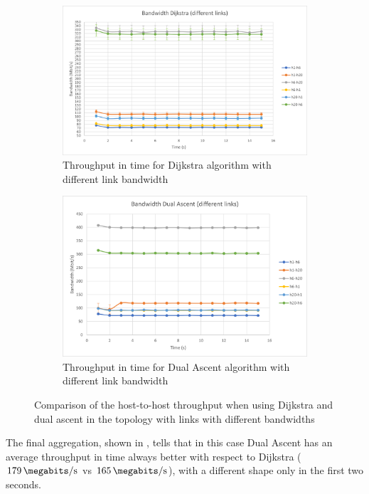 \begin{figure}
	\centering
	\begin{subfigure}[b]{\textwidth}
		\includegraphics[width=\textwidth]{img/band-div-dijkstra.png}
		\caption{Throughput in time for Dijkstra algorithm with
		different link bandwidth}\label{subfig:band-div-dijkstra}
	\end{subfigure}
	\begin{subfigure}[b]{\textwidth}
		\centering
		\includegraphics[width=\textwidth]{img/band-div-dual.png}
		\caption{Throughput in time for Dual Ascent algorithm with
		different link bandwidth}\label{subfig:band-div-dual}
	\end{subfigure}
	\caption{Comparison of the host-to-host throughput when using Dijkstra
	and dual ascent in the topology with links with different
	bandwidths}\label{fig:bandwidth-difflinks}
\end{figure}

The final aggregation, shown in , tells that in
this case Dual Ascent has an average throughput in time always better with
respect to Dijkstra (\(\SI{179}{\megabits\per\second}\) vs
\(\SI{165}{\megabits\per\second}\)), with a different shape only in the first
two seconds.


